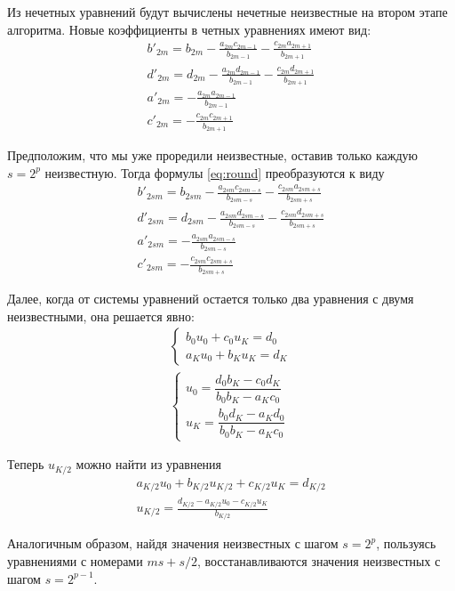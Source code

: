 \documentclass[12pt]{article}
\begin{document}
Из нечетных уравнений будут вычислены нечетные неизвестные на втором этапе алгоритма.
Новые коэффициенты в четных уравнениях имеют вид:
\begin{gather}
\nonumber
b'_{2m} = b_{2m} - \frac{a_{2m}c_{2m-1}}{b_{2m-1}} -
\frac{c_{2m}a_{2m+1}}{b_{2m+1}}\\\label{eq:round}
d'_{2m} = d_{2m} - \frac{a_{2m}d_{2m-1}}{b_{2m-1}} -
\frac{c_{2m}d_{2m+1}}{b_{2m+1}}\\\nonumber
a'_{2m} = -\frac{a_{2m}a_{2m-1}}{b_{2m-1}}\\\nonumber
c'_{2m} = -\frac{c_{2m}c_{2m+1}}{b_{2m+1}}
\end{gather}

Предположим, что мы уже проредили неизвестные, оставив только каждую $s=2^p$
неизвестную. Тогда формулы \eqref{eq:round} преобразуются к виду
\begin{gather}
\nonumber
b'_{2sm} = b_{2sm} - \frac{a_{2sm}c_{2sm-s}}{b_{2sm-s}} -
\frac{c_{2sm}a_{2sm+s}}{b_{2sm+s}}\\\label{eq:rounds}
d'_{2sm} = d_{2sm} - \frac{a_{2sm}d_{2sm-s}}{b_{2sm-s}} -
\frac{c_{2sm}d_{2sm+s}}{b_{2sm+s}}\\\nonumber
a'_{2sm} = -\frac{a_{2sm}a_{2sm-s}}{b_{2sm-s}}\\\nonumber
c'_{2sm} = -\frac{c_{2sm}c_{2sm+s}}{b_{2sm+s}}
\end{gather}

Далее, когда от системы уравнений остается только два уравнения с двумя
неизвестными, она решается явно:
\begin{gather*}
\begin{cases}
b_0 u_0 + c_0 u_K = d_0\\
a_K u_0 + b_K u_K = d_K
\end{cases}\\
\begin{cases}
u_0 = \dfrac{d_0 b_K - c_0 d_K}{b_0 b_K - a_K c_0}\\
u_K = \dfrac{b_0 d_K - a_K d_0}{b_0 b_K - a_K c_0}
\end{cases}
\end{gather*}

Теперь $u_{K/2}$ можно найти из уравнения
\begin{gather*}
a_{K/2} u_0 + b_{K/2} u_{K/2} + c_{K/2} u_K = d_{K/2}\\
u_{K/2} = \frac{d_{K/2} - a_{K/2}u_0 - c_{K/2} u_K}{b_{K/2}}
\end{gather*}

Аналогичным образом, найдя значения неизвестных с шагом $s = 2^p$, пользуясь
уравнениями с номерами $ms + s/2$, восстанавливаются значения неизвестных с шагом
$s = 2^{p-1}$.
\end{document}
